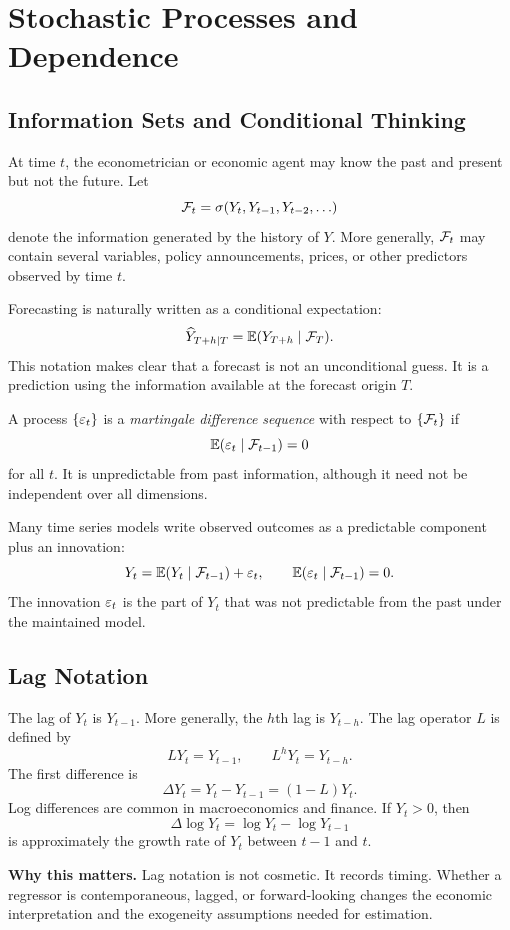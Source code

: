 \section{Stochastic Processes and Dependence}

\subsection{Information Sets and Conditional Thinking}
At time $t$, the econometrician or economic agent may know the past and present but not the future. Let
\[
\mathcal{F}_t=\sigma(Y_t,Y_{t-1},Y_{t-2},\ldots)
\]
denote the information generated by the history of $Y$. More generally, $\mathcal{F}_t$ may contain several variables, policy announcements, prices, or other predictors observed by time $t$.

Forecasting is naturally written as a conditional expectation:
\[
\widehat{Y}_{T+h|T}=\mathbb{E}(Y_{T+h}\mid \mathcal{F}_T).
\]
This notation makes clear that a forecast is not an unconditional guess. It is a prediction using the information available at the forecast origin $T$.

\begin{defN}
A process $\{\varepsilon_t\}$ is a \emph{martingale difference sequence} with respect to $\{\mathcal{F}_t\}$ if
\[
\mathbb{E}(\varepsilon_t\mid \mathcal{F}_{t-1})=0
\]
for all $t$. It is unpredictable from past information, although it need not be independent over all dimensions.
\end{defN}

Many time series models write observed outcomes as a predictable component plus an innovation:
\[
Y_t=\mathbb{E}(Y_t\mid \mathcal{F}_{t-1})+\varepsilon_t,
\qquad
\mathbb{E}(\varepsilon_t\mid \mathcal{F}_{t-1})=0.
\]
The innovation $\varepsilon_t$ is the part of $Y_t$ that was not predictable from the past under the maintained model.

\subsection{Lag Notation}
The lag of $Y_t$ is $Y_{t-1}$. More generally, the $h$th lag is $Y_{t-h}$. The lag operator $L$ is defined by
\[
LY_t=Y_{t-1},\qquad L^hY_t=Y_{t-h}.
\]
The first difference is
\[
\Delta Y_t=Y_t-Y_{t-1}=(1-L)Y_t.
\]
Log differences are common in macroeconomics and finance. If $Y_t>0$, then
\[
\Delta \log Y_t=\log Y_t-\log Y_{t-1}
\]
is approximately the growth rate of $Y_t$ between $t-1$ and $t$.

\begin{boxD}
\textbf{Why this matters.}
Lag notation is not cosmetic. It records timing. Whether a regressor is contemporaneous, lagged, or forward-looking changes the economic interpretation and the exogeneity assumptions needed for estimation.
\end{boxD}


